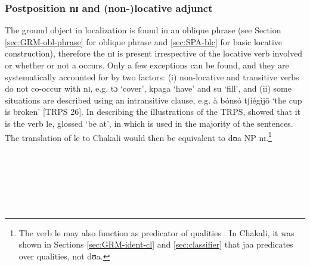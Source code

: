 \begin{exe}
\begin{exe}
\begin{exe}
\subsubsection{Postposition {\sls nɪ} and (non-)locative adjunct}
\label{sec:SPA-postp}

The ground object in localization is found in an oblique phrase  (see Section \ref{sec:GRM-obl-phrase} for oblique phrase and \ref{sec:SPA-blc} for basic locative construction), therefore the   {\sls nɪ} is present irrespective of the locative verb involved or whether or not a  occurs. Only a  few exceptions can be found,   and they are systematically accounted for by two factors: (i) non-locative and transitive verbs  do not co-occur with {\sls nɪ}, e.g. {\sls tɔ} `cover', {\sls kpaga} `have' and {\sls su} `fill',  and (ii) some situations are described using an intransitive clause, e.g.   {\sls à bónsó tʃíégìjō} `the cup is broken'  [TRPS 26].  In describing the illustrations of the TRPS, \citet[370]{Amek06} showed that it is the  verb {\sls le}, glossed  `be at',  in  which is used in the majority of the sentences.   The translation of   {\sls le} to Chakali would then be equivalent to {\sls dʊa {\rm NP} nɪ}.\footnote{The  verb {\sls le} may also function as predicator of qualities \citep[373]{Amek06}. In Chakali,  it was shown  in Sections \ref{sec:GRM-ident-cl} and \ref{sec:classifier} that   {\sls jaa} predicates over qualities,  not  {\sls dʊa}.}

\newpage 

\ea\label{ex:postp-corres}
 \\
 
 \\
 
  \\
 
  \\
  
   \\
 

\end{exe}
\end{exe}
\end{exe}
